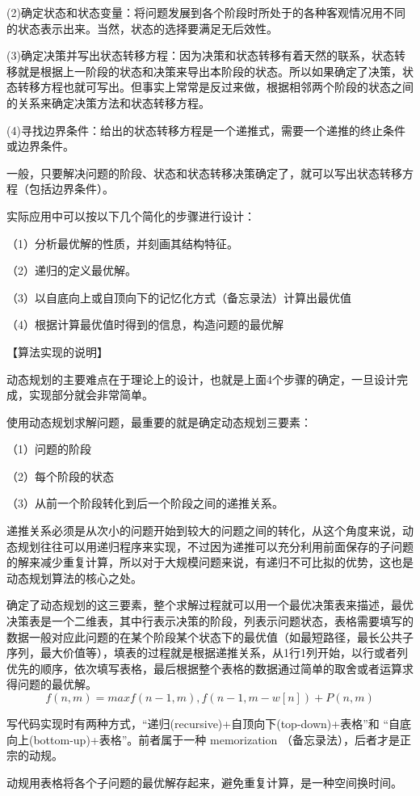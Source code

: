 (2)确定状态和状态变量：将问题发展到各个阶段时所处于的各种客观情况用不同的状态表示出来。当然，状态的选择要满足无后效性。

(3)确定决策并写出状态转移方程：因为决策和状态转移有着天然的联系，状态转移就是根据上一阶段的状态和决策来导出本阶段的状态。所以如果确定了决策，状态转移方程也就可写出。但事实上常常是反过来做，根据相邻两个阶段的状态之间的关系来确定决策方法和状态转移方程。

(4)寻找边界条件：给出的状态转移方程是一个递推式，需要一个递推的终止条件或边界条件。

一般，只要解决问题的阶段、状态和状态转移决策确定了，就可以写出状态转移方程（包括边界条件）。

实际应用中可以按以下几个简化的步骤进行设计：

（1）分析最优解的性质，并刻画其结构特征。

（2）递归的定义最优解。

（3）以自底向上或自顶向下的记忆化方式（备忘录法）计算出最优值

（4）根据计算最优值时得到的信息，构造问题的最优解

【算法实现的说明】

动态规划的主要难点在于理论上的设计，也就是上面4个步骤的确定，一旦设计完成，实现部分就会非常简单。

使用动态规划求解问题，最重要的就是确定动态规划三要素：

（1）问题的阶段 

（2）每个阶段的状态

（3）从前一个阶段转化到后一个阶段之间的递推关系。

递推关系必须是从次小的问题开始到较大的问题之间的转化，从这个角度来说，动态规划往往可以用递归程序来实现，不过因为递推可以充分利用前面保存的子问题的解来减少重复计算，所以对于大规模问题来说，有递归不可比拟的优势，这也是动态规划算法的核心之处。

确定了动态规划的这三要素，整个求解过程就可以用一个最优决策表来描述，最优决策表是一个二维表，其中行表示决策的阶段，列表示问题状态，表格需要填写的数据一般对应此问题的在某个阶段某个状态下的最优值（如最短路径，最长公共子序列，最大价值等），填表的过程就是根据递推关系，从1行1列开始，以行或者列优先的顺序，依次填写表格，最后根据整个表格的数据通过简单的取舍或者运算求得问题的最优解。
$$f(n,m)=max{f(n-1,m), f(n-1,m-w[n])+P(n,m)}$$

写代码实现时有两种方式，“递归(recursive)+自顶向下(top-down)+表格”和
“自底向上(bottom-up)+表格”。前者属于一种 memorization （备忘录法），后者才是正宗的动规。

动规用表格将各个子问题的最优解存起来，避免重复计算，是一种空间换时间。

